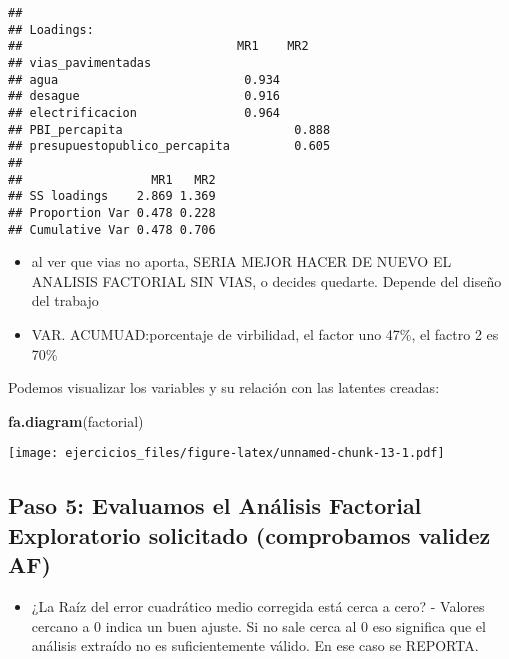 \documentclass[
]{article}
\newenvironment{Shaded}{\begin{snugshade}}{\end{snugshade}}
\newcommand{\KeywordTok}[1]{\textcolor[rgb]{0.13,0.29,0.53}{\textbf{#1}}}
\newcommand{\NormalTok}[1]{#1}
\newcommand{\OperatorTok}[1]{\textcolor[rgb]{0.81,0.36,0.00}{\textbf{#1}}}
\providecommand{\tightlist}{%
  \setlength{\itemsep}{0pt}\setlength{\parskip}{0pt}}
\begin{document}
\begin{verbatim}
## 
## Loadings:
##                              MR1    MR2   
## vias_pavimentadas                         
## agua                          0.934       
## desague                       0.916       
## electrificacion               0.964       
## PBI_percapita                        0.888
## presupuestopublico_percapita         0.605
## 
##                  MR1   MR2
## SS loadings    2.869 1.369
## Proportion Var 0.478 0.228
## Cumulative Var 0.478 0.706
\end{verbatim}

\begin{itemize}
\tightlist
\item
  al ver que vias no aporta, SERIA MEJOR HACER DE NUEVO EL ANALISIS
  FACTORIAL SIN VIAS, o decides quedarte. Depende del diseño del trabajo
\item
  VAR. ACUMUAD:porcentaje de virbilidad, el factor uno 47\%, el factro 2
  es 70\%
\end{itemize}

Podemos visualizar los variables y su relación con las latentes creadas:

\begin{Shaded}
\begin{Highlighting}[]
\KeywordTok{fa.diagram}\NormalTok{(factorial)}
\end{Highlighting}
\end{Shaded}

\texttt{[image: ejercicios\_files/figure-latex/unnamed-chunk-13-1.pdf]}

\hypertarget{paso-5-evaluamos-el-anuxe1lisis-factorial-exploratorio-solicitado-comprobamos-validez-af}{%
\subsection{Paso 5: Evaluamos el Análisis Factorial Exploratorio
solicitado (comprobamos validez
AF)}\label{paso-5-evaluamos-el-anuxe1lisis-factorial-exploratorio-solicitado-comprobamos-validez-af}}

\begin{itemize}
\tightlist
\item
  ¿La Raíz del error cuadrático medio corregida está cerca a cero? -
  Valores cercano a 0 indica un buen ajuste. Si no sale cerca al 0 eso
  significa que el análisis extraído no es suficientemente válido. En
  ese caso se REPORTA.
\end{itemize}

\begin{Shaded}
\end{Shaded}
\end{document}
